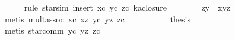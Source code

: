 \begin{isabellebody}
\ \ \ \ \isamarkupfalse%
\ {}rule\ star{}sim{}\ insert\ xc\ yc\ zc{}\ ka{}closure{}{}\isanewline
\ \ \ \ \ \ \isamarkupfalse%
\ {}z{}y\ {}\ x{}y{}z{}\isanewline
\ \ \ \ \ \ \ \ \isamarkupfalse%
\ {}metis\ mult{}assoc\ xc\ xz\ yc\ yz\ zc{}\isanewline
\ \ \ \ \isamarkupfalse%
\isanewline
\ \ \ \ \isamarkupfalse%
\ {}thesis\isanewline
\ \ \ \ \ \ \isamarkupfalse%
\ {}metis\ star{}comm\ yc\ yz\ zc{}\isanewline
\ \ \isamarkupfalse%
%
\endisatagproof
{\isafoldproof}%
%
\isadelimproof
\isanewline
%
\endisadelimproof
\isanewline
{}\isamarkupfalse%
\isanewline
%
\isadelimtheory
\isanewline
%
\endisadelimtheory
%
\isatagtheory
{}\isamarkupfalse%
%
\endisatagtheory
{\isafoldtheory}%
%
\isadelimtheory
\isanewline
%
\endisadelimtheory
\end{isabellebody}%
